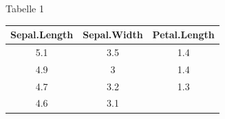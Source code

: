 \begin{frame}{Tabelle 1}

\begin{longtable}[c]{@{}ccc@{}}
\toprule
\begin{minipage}[b]{0.19\columnwidth}\centering\strut
Sepal.Length
\strut\end{minipage} &
\begin{minipage}[b]{0.18\columnwidth}\centering\strut
Sepal.Width
\strut\end{minipage} &
\begin{minipage}[b]{0.18\columnwidth}\centering\strut
Petal.Length
\strut\end{minipage}\tabularnewline
\midrule
\endhead
\begin{minipage}[t]{0.19\columnwidth}\centering\strut
5.1
\strut\end{minipage} &
\begin{minipage}[t]{0.18\columnwidth}\centering\strut
3.5
\strut\end{minipage} &
\begin{minipage}[t]{0.18\columnwidth}\centering\strut
1.4
\strut\end{minipage}\tabularnewline
\begin{minipage}[t]{0.19\columnwidth}\centering\strut
4.9
\strut\end{minipage} &
\begin{minipage}[t]{0.18\columnwidth}\centering\strut
3
\strut\end{minipage} &
\begin{minipage}[t]{0.18\columnwidth}\centering\strut
1.4
\strut\end{minipage}\tabularnewline
\begin{minipage}[t]{0.19\columnwidth}\centering\strut
4.7
\strut\end{minipage} &
\begin{minipage}[t]{0.18\columnwidth}\centering\strut
3.2
\strut\end{minipage} &
\begin{minipage}[t]{0.18\columnwidth}\centering\strut
1.3
\strut\end{minipage}\tabularnewline
\begin{minipage}[t]{0.19\columnwidth}\centering\strut
4.6
\strut\end{minipage} &
\begin{minipage}[t]{0.18\columnwidth}\centering\strut
3.1
\strut\end{minipage} &
\begin{minipage}[t]{0.18\columnwidth}\centering\strut

\end{minipage}
\end{longtable}
\end{frame}
